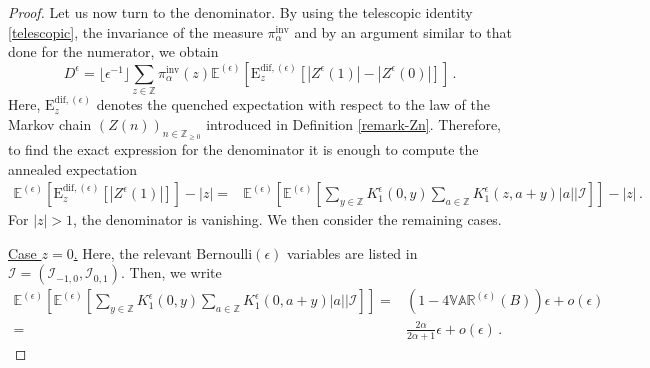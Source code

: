 \documentclass[a4paper,11pt,oneside,reqno]{amsart}
\theoremstyle{definition}
\renewcommand{\geq}{\geqslant}
\numberwithin{equation}{section}
\begin{document}
\begin{proof}
\bigskip 
Let us now turn to the denominator. 
		By using the telescopic identity \eqref{telescopic}, the invariance of the measure $\pi^{\text{inv}}_{\alpha}$ and by an argument similar to that done for the numerator, we obtain 
	\begin{equation}\label{denominator-approximation}
		D^{\epsilon}=\lfloor\epsilon^{-1}\rfloor
		\sum_{z\in \mathbb{Z}}\pi^{\text{inv}}_{\alpha}(z)\mathbb{E}^{(\epsilon)}\left[\mathrm{E}_{z}^{\text{dif},(\epsilon)}\left[|Z^{\epsilon}(1)|-|Z^{\epsilon}(0)|\right]\right]\,.
	\end{equation}
	Here, $\mathrm{E}_{z}^{\text{dif},(\epsilon)}$ denotes the quenched expectation with respect to the law of the Markov chain $(Z(n))_{n\in \mathbb{Z}_{\geq 0}}$ introduced in Definition \ref{remark-Zn}. Therefore, to find the exact expression for the denominator it is enough to compute the annealed expectation
	\begin{equation*}
		\begin{split}
			\mathbb{E}^{(\epsilon)}\left[\mathrm{E}_{z}^{\text{dif},(\epsilon)}\left[|Z^{\epsilon}(1)|\right]\right]-|z|=&\mathbb{E}^{(\epsilon)}\left[\mathbb{E}^{(\epsilon)}\left[\sum_{y\in \mathbb{Z}}K_{1}^{\epsilon}(0,y)\sum_{a\in \mathbb{Z}}K_{1}^{\epsilon}(z,a+y)|a|
			\bigg| \bm{\mathcal{I}}\right]\right]-|z|\,.
		\end{split}
	\end{equation*}
	For $|z|>1$, the denominator is vanishing. We then consider the remaining cases.
\item{\underline{Case $z=0$.}}  Here, the relevant $\text{Bernoulli}(\epsilon)$ variables are listed in $\bm{\mathcal{I}}=(\mathcal{I}_{-1,0},\mathcal{I}_{0,1})$. Then, we write
	\begin{equation*}
		\begin{split}
			\mathbb{E}^{(\epsilon)}\left[\mathbb{E}^{(\epsilon)}\left[\sum_{y\in \mathbb{Z}}K_{1}^{\epsilon}(0,y)\sum_{a\in \mathbb{Z}}K_{1}^{\epsilon}(0,a+y)|a|\bigg| \mathcal{I}\right]\right]=&
			\left(1-4\mathbb{VAR}^{(\epsilon)}(B)\right)\epsilon+o(\epsilon)
			\\=&
			\frac{2\alpha}{2\alpha+1}\epsilon+o(\epsilon)\,.
		\end{split}
	\end{equation*}
	

\end{proof}
\end{document}
